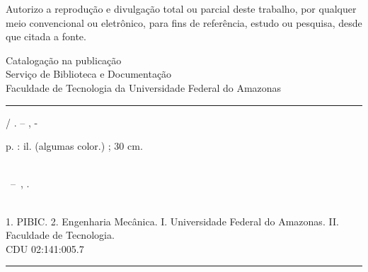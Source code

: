 \documentclass[
	12pt,				%
	openright,			%
	oneside,				%
	a4paper,				%
	chapter=TITLE,		%
	english,			%
	french,			%
	spanish,			%
	brazil			%
	]{abntex2}
\begin{document}
\begin{fichacatalografica}
	\begin{minipage}[c]{12.5cm}	
	\noindent Autorizo a reprodução e divulgação total ou parcial deste trabalho, por qualquer meio convencional ou eletrônico, para fins de referência, estudo ou pesquisa, desde que citada a fonte. \\[1cm]
		\begin{center}
			Catalogação na publicação \\
			Serviço de Biblioteca e Documentação \\
			Faculdade de Tecnologia da Universidade Federal do Amazonas
		\end{center}
	\end{minipage}
	
	\vspace*{\fill}					%
	\hrule							%
	\begin{center}					%
	\begin{minipage}[c]{12.5cm}		%
	
	\imprimirautor
	
	\hspace{0.5cm} \imprimirtitulo  / \imprimirautor. --
	\imprimirlocal, \imprimirdata-
	
	\hspace{0.5cm} \pageref{LastPage} p. : il. (algumas color.) ; 30 cm.\\
	
	\hspace{0.5cm} \imprimirorientadorRotulo~\imprimirorientador\\
	
	\hspace{0.5cm}
	\parbox[t]{\textwidth}{\imprimirtipotrabalho~--~\imprimirinstituicao,
	\imprimirdata.}\\
	
	\hspace{0.5cm}
		1. PIBIC.
		2. Engenharia Mecânica.
		I. Universidade Federal do Amazonas.
		II. Faculdade de Tecnologia.\\ 			
	
	\hspace{8.75cm} CDU 02:141:005.7\\
	
	\end{minipage}
	\end{center}
	\hrule
\end{fichacatalografica}
\cleardoublepage
\end{document}
